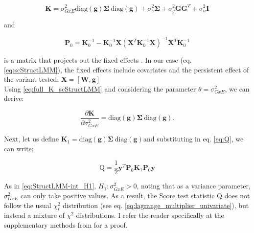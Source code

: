 \begin{equation}\label{eq:full_K_scStructLMM}
    \mathbf{K} = \sigma_{GxE}^2\mathrm{diag}(\mathbf{g})\boldsymbol{\Sigma} \ \mathrm{diag}(\mathbf{g}) +  \sigma_e^2 \boldsymbol{\Sigma} + \sigma_g^2 \mathbf{G}\mathbf{G}^T+ \sigma_n^2 \mathbf{I}
\end{equation}

and 

\begin{equation}
    \mathbf{P}_0 = \mathbf{K}_0^{-1}-\mathbf{K}_0^{-1}\mathbf{X}(\mathbf{X}^T\mathbf{K}_0^{-1}\mathbf{X})^{-1}\mathbf{X}^T\mathbf{K}_0^{-1}
\end{equation}

is a matrix that projects out the fixed effects \cite{lippert2011fast, lippert2014greater}.
In our case (eq. \eqref{eq:scStructLMM}), the fixed effects include covariates and the persistent effect of the variant tested: $\mathbf{X} = [\mathbf{W}, \mathbf{g}]$\\

Using \eqref{eq:full_K_scStructLMM} and considering the parameter $\theta = \sigma_{GxE}^2$, we can derive:



\begin{equation}
    \frac{\partial \mathbf{K}}{\partial \sigma_{GxE}^2} = \mathrm{diag}(\mathbf{g})\boldsymbol{\Sigma} \ \mathrm{diag}(\mathbf{g}).
\end{equation}

Next, let us define $\mathbf{K}_1 = \mathrm{diag}(\mathbf{g})\boldsymbol{\Sigma} \ \mathrm{diag}(\mathbf{g})$and substituting in eq. \eqref{eq:Q}, we can write:

\begin{equation}
    \mathrm{Q} = \frac{1}{2}\mathbf{y}^T\mathbf{P}_0 \mathbf{K}_1\mathbf{P}_0 \mathbf{y} 
\end{equation}

As in \eqref{eq:StructLMM-int_H1}, $H_1: \sigma_{GxE}^2>0$, noting that as a variance parameter, $\sigma_{GxE}^2$ can only take positive values.
As a result, the Score test statistic $\mathrm{Q}$ does not follow the usual $\chi^2_i$ distribution (see eq. \eqref{eq:lagrange_multiplier_univariate}), but instead a mixture of  $\chi^2$ distributions.
I refer the reader specifically at the supplementary methods from \cite{lippert2014greater} for a proof.

